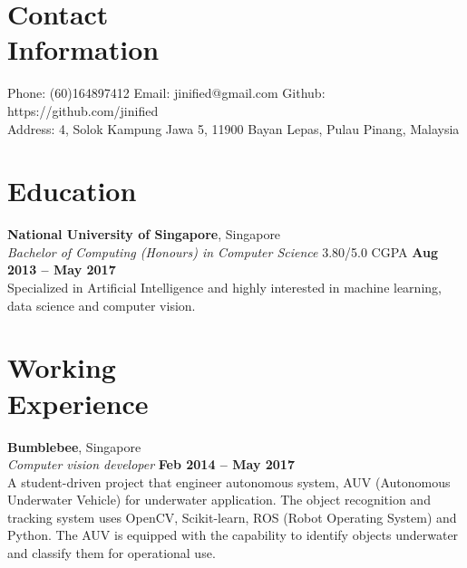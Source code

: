 \documentclass[margin,line]{resume}
\begin{document}
\begin{resume}
    \section{\mysidestyle Contact\\Information}

    Phone: (60)164897412       \hfill Email: jinified@gmail.com  \hfill Github:
    https://github.com/jinified \vspace{0mm}\\ Address: 4, Solok Kampung Jawa 5,
    11900 Bayan Lepas, Pulau Pinang, Malaysia \vspace{0mm}\\ \vspace{-4.5mm}

    \section{\mysidestyle Education}

    \textbf{National University of Singapore}, Singapore \vspace{2mm}\\\vspace{1mm}%
    \textsl{Bachelor of Computing (Honours) in Computer Science} 3.80/5.0 CGPA \hfill \textbf{Aug 2013 -- May 2017}\\
    Specialized in Artificial Intelligence and highly interested in machine
    learning, data science and computer vision.

    \section{\mysidestyle Working\\Experience}

    \textbf{Bumblebee}, Singapore \vspace{2mm}\\\vspace{1mm}%
    \textsl{Computer vision developer} \hfill \textbf{Feb 2014 -- May 2017}\\
    A student-driven project that engineer autonomous system, AUV (Autonomous
    Underwater Vehicle) for underwater application. The object recognition and
    tracking system uses OpenCV, Scikit-learn, ROS (Robot Operating System) and
    Python. The AUV is equipped with the capability to identify objects
    underwater and classify them for operational use.
    

\end{resume}
\end{document}
